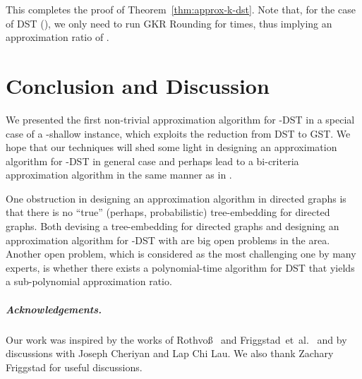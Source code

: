 \documentclass[11pt]{article}
\theoremstyle{definition}
\theoremstyle{remark}
\begin{document}
This completes the proof of Theorem~\ref{thm:approx-k-dst}.
Note that, for the case of DST (), we only need to run GKR
Rounding for  times, thus implying an approximation ratio of
. 

\section{Conclusion and Discussion}
\label{sec:conclusion}

We presented the first non-trivial approximation algorithm for -DST
in a special case of a -shallow instance, which exploits
the reduction from DST to GST. 
We hope that our techniques will shed some light in designing 
an approximation algorithm for -DST in general case and
perhaps lead to a bi-criteria approximation algorithm in the same manner
as in \cite{ChalermsookGL15}.

One obstruction in designing an approximation algorithm in directed
graphs is that there is no ``true'' (perhaps, probabilistic) tree-embedding for
directed graphs.
Both devising a tree-embedding for directed graphs and designing an
approximation algorithm for -DST with  are big open
problems in the area.
Another open problem, which is considered as the most challenging one
by many experts, is whether there exists a polynomial-time algorithm
for DST that yields a sub-polynomial approximation ratio.

\subparagraph*{Acknowledgements.}
Our work was inspired by the works of 
Rothvo{\ss}~\cite{Rothvoss11} and 
Friggstad~et~al.~\cite{FriggstadKKLST14}
and by discussions with Joseph Cheriyan and Lap Chi Lau.
We also thank Zachary Friggstad for useful discussions.



\end{document}
